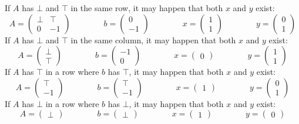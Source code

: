 \documentclass[]{article}
\renewcommand{\.}{\hskip .75pt}
\let\*=\cdot
\begin{document}
If $A$ has $\bot$ and $\top$ in the same row, it may happen that both $x$ and $y$ exist:
$$
A =
\begin{pmatrix}
	\bot & \top \\
	0 & -1
\end{pmatrix}
\qquad \qquad
b = \begin{pmatrix}	0 \\ -1 \end{pmatrix}
\qquad \qquad
x = \begin{pmatrix} 1 \\ 1 \end{pmatrix}
\qquad \qquad
y = \begin{pmatrix} 0 \\ 1 \end{pmatrix}
$$
If $A$ has $\bot$ and $\top$ in the same column, it may happen that both $x$ and $y$ exist:
$$
A =
\begin{pmatrix}
	\bot \\
	\top
\end{pmatrix}
\qquad \qquad
b = \begin{pmatrix}	-1 \\ 0 \end{pmatrix}
\qquad \qquad
x = \begin{pmatrix} 0 \end{pmatrix}
\qquad \qquad
y = \begin{pmatrix} 1 \\ 1 \end{pmatrix}
$$
If $A$ has $\top$ in a row where $b$ has $\top$, it may happen that both $x$ and $y$ exist:
$$
A =
\begin{pmatrix}
	\top \\
	-1
\end{pmatrix}
\qquad \qquad
b = \begin{pmatrix}	\top \\	-1 \end{pmatrix}
\qquad \qquad
x = \begin{pmatrix}	1 \end{pmatrix}
\qquad \qquad
y = \begin{pmatrix} 0 \\ 1 \end{pmatrix}
$$
If $A$ has $\bot$ in a row where $b$ has $\bot$, it may happen that both $x$ and $y$ exist:
$$
A =
\begin{pmatrix}
	\bot
\end{pmatrix}
\qquad \qquad
b = \begin{pmatrix}	\bot \end{pmatrix}
\qquad \qquad
x = \begin{pmatrix}	1 \end{pmatrix}
\qquad \qquad
y = \begin{pmatrix}	0 \end{pmatrix}
$$
\end{document}
